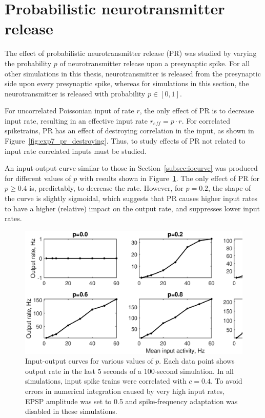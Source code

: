 \documentclass[a4paper,12pt]{report}
\theoremstyle{definition}
\begin{document}
\section{Probabilistic neurotransmitter release} %
\label{sec:probrelease}

The effect of probabilistic neurotransmitter release (PR) was studied by varying the probability $p$ of neurotransmitter release upon a presynaptic spike. For all other simulations in this thesis, neurotransmitter is released from the presynaptic side upon every presynaptic spike, whereas for simulations in this section, the neurotransmitter is released with probability $p \in [0,1]$.

For uncorrelated Poissonian input of rate $r$, the only effect of PR is to decrease input rate, resulting in an effective input rate $r_{eff} = p \cdot r$. For correlated spiketrains, PR has an effect of destroying correlation in the input, as shown in Figure~\ref{fig:exp7_pr_destroying}. Thus, to study effects of PR not related to input rate correlated inputs must be studied.



An input-output curve similar to those in Section~\ref{subsec:iocurve} was produced for different values of $p$ with results shown in Figure~\ref{fig:exp8gridoutputs}. The only effect of PR for $p \geq 0.4$ is, predictably, to decrease the rate. However, for $p=0.2$, the shape of the curve is slightly sigmoidal, which suggests that PR causes higher input rates to have a higher (relative) impact on the output rate, and suppresses lower input rates.

\begin{figure}[!htb]
    \includegraphics[width=\textwidth]{figures/exp8_gridoutputs_epsp05.eps}
    \caption{Input-output curves for various values of $p$. Each data point shows output rate in the last 5 seconds of a 100-second simulation. In all simulations, input spike trains were correlated with $c=0.4$. To avoid errors in numerical integration caused by very high input rates, EPSP amplitude was set to 0.5 and spike-frequency adaptation was disabled in these simulations.}
    \label{fig:exp8gridoutputs}
\end{figure}
\end{document}
